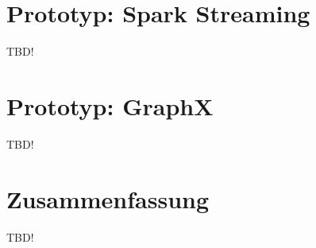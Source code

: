 

\section{Prototyp: Spark Streaming }
\label{section:prototyp spark streaming}

TBD!



\section{Prototyp: GraphX}
\label{section:prototyp graphX}

TBD!




\section{Zusammenfassung}
\label{section:zusammen}



TBD!


